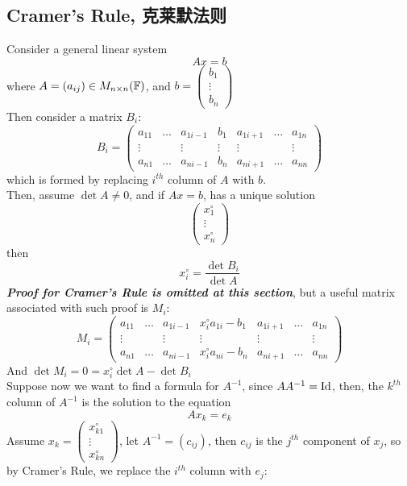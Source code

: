 \subsection{Cramer's Rule, 克莱默法则}
Consider a general linear system
$$Ax = b$$
where $A = (a_{ij}) \in M_{n \times n}(\mathbb{F})$, and $b = \begin{pmatrix}
    b_1 \\
    \vdots \\
    b_n
\end{pmatrix}$ \\
Then consider a matrix $B_i$:
$$B_i = \begin{pmatrix}
    a_{11} & \dots & a_{1i-1} & b_1 & a_{1i+1} & \dots & a_{1n} \\
    \vdots & & \vdots & \vdots & \vdots & & \vdots \\
    a_{n1} & \dots & a_{ni-1} & b_n & a_{ni+1} & \dots & a_{nn}
\end{pmatrix}$$
which is formed by replacing $i^{th}$ column of $A$ with $b$. \\
Then, assume $\det A \ne 0$, and if $Ax = b$, has a unique solution
$$\begin{pmatrix}
    x_{1}^{\circ} \\
    \vdots \\
    x_{n}^{\circ}
\end{pmatrix}$$
then
$$x_i^{\circ} = \frac{\det B_i}{\det A}$$
\textbf{\textit{Proof for Cramer's Rule is omitted at this section}}, but a useful matrix associated with such proof is $M_i$:
$$M_i = \begin{pmatrix}
    a_{11} & \dots & a_{1i-1} & x_i^{\circ}a_{1i} - b_1 & a_{1i+1} & \dots & a_{1n} \\
    \vdots & & \vdots & \vdots & \vdots & & \vdots \\
    a_{n1} & \dots & a_{ni-1} & x_i^{\circ}a_{ni} - b_n & a_{ni+1} & \dots & a_{nn}
\end{pmatrix}$$
And $\det M_i = 0 = x_i^{\circ} \det A - \det B_i$
\\
Suppose now we want to find a formula for $A^{-1}$, since $AA^{-1} = \text{Id}$, then, the $k^{th}$ column of $A^{-1}$ is the solution to the equation
$$Ax_k = e_k$$
Assume $x_k = \begin{pmatrix}
    x_{k1}^{\circ} \\
    \vdots \\
    x_{kn}^{\circ}
\end{pmatrix}$, let $A^{-1} = (c_{ij})$, then $c_{ij}$ is the $j^{th}$ component of $x_j$, so by Cramer's Rule, we replace the $i^{th}$ column with $e_j$:

